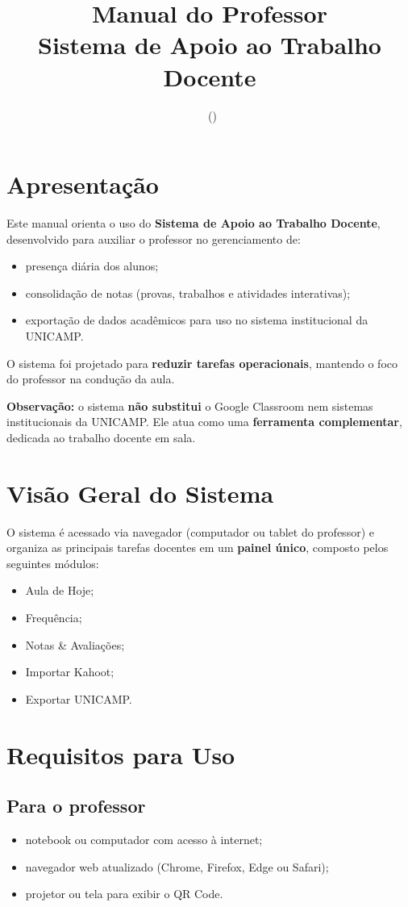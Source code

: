 \documentclass[12pt,a4paper]{article}
\title{\textbf{Manual do Professor}\\
Sistema de Apoio ao Trabalho Docente\\
\Disciplina}
\author{}
\date{\DataManual\ (\VersaoManual)}
\begin{document}
\maketitle

\section{Apresentação}
Este manual orienta o uso do \textbf{Sistema de Apoio ao Trabalho Docente}, desenvolvido para auxiliar o professor no gerenciamento de:
\begin{itemize}[noitemsep]
  \item presença diária dos alunos;
  \item consolidação de notas (provas, trabalhos e atividades interativas);
  \item exportação de dados acadêmicos para uso no sistema institucional da UNICAMP.
\end{itemize}

O sistema foi projetado para \textbf{reduzir tarefas operacionais}, mantendo o foco do professor na condução da aula.

\textbf{Observação:} o sistema \textbf{não substitui} o Google Classroom nem sistemas institucionais da UNICAMP. Ele atua como uma \textbf{ferramenta complementar}, dedicada ao trabalho docente em sala.

\section{Visão Geral do Sistema}
O sistema é acessado via navegador (computador ou tablet do professor) e organiza as principais tarefas docentes em um \textbf{painel único}, composto pelos seguintes módulos:
\begin{itemize}[noitemsep]
  \item Aula de Hoje;
  \item Frequência;
  \item Notas \& Avaliações;
  \item Importar Kahoot;
  \item Exportar UNICAMP.
\end{itemize}

\section{Requisitos para Uso}
\subsection*{Para o professor}
\begin{itemize}[noitemsep]
  \item notebook ou computador com acesso à internet;
  \item navegador web atualizado (Chrome, Firefox, Edge ou Safari);
  \item projetor ou tela para exibir o QR Code.
\end{itemize}
\end{document}
